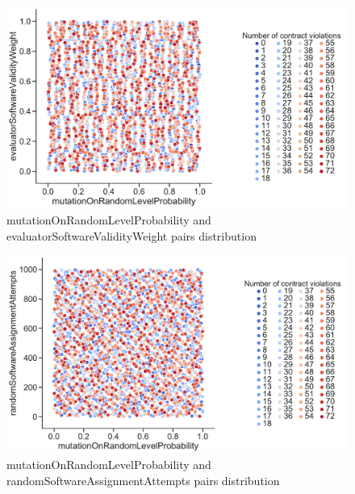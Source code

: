\begin{figure}
	\centering
	\includegraphics[width=\textwidth]{images/PairsDistr/mutationOnRandomLevelProbability_evaluatorSoftwareValidityWeight.pdf}
	\caption[mutationOnRandomLevelProbability and evaluatorSoftwareValidityWeight pairs distribution]{mutationOnRandomLevelProbability and evaluatorSoftwareValidityWeight pairs distribution}   
	\label{fig:mutationOnRandomLevelProbability_evaluatorSoftwareValidityWeight_pair}
\end{figure}
\clearpage
\begin{figure}
	\centering
	\includegraphics[width=\textwidth]{images/PairsDistr/mutationOnRandomLevelProbability_randomSoftwareAssignmentAttempts.pdf}
	\caption[mutationOnRandomLevelProbability and randomSoftwareAssignmentAttempts pairs distribution]{mutationOnRandomLevelProbability and randomSoftwareAssignmentAttempts pairs distribution} 
	\label{fig:mutationOnRandomLevelProbability_randomSoftwareAssignmentAttempts_pair}
\end{figure}
\clearpage
